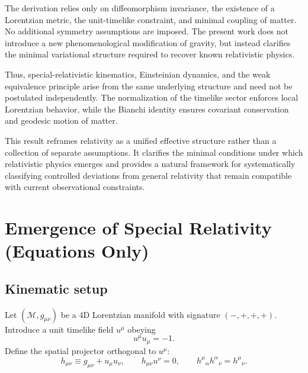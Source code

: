 \documentclass[11pt]{article}
\begin{document}
        The derivation relies only on diffeomorphism invariance, the existence of a
        Lorentzian metric, the unit-timelike constraint, and minimal coupling of matter.
        No additional symmetry assumptions are imposed.
        The present work does not introduce a new phenomenological modification of
        gravity, but instead clarifies the minimal variational structure required to
        recover known relativistic physics.

        Thus, special-relativistic kinematics, Einsteinian dynamics, and the weak
        equivalence principle arise from the same underlying structure and need not be
        postulated independently. The normalization of the timelike sector enforces
        local Lorentzian behavior, while the Bianchi identity ensures covariant
        conservation and geodesic motion of matter.

        This result reframes relativity as a unified effective structure rather than a
        collection of separate assumptions. It clarifies the minimal conditions under
        which relativistic physics emerges and provides a natural framework for
        systematically classifying controlled deviations from general relativity that
        remain compatible with current observational constraints.


    \section{Emergence of Special Relativity (Equations Only)}
        \label{sec:sr-emergence}

        \subsection{Kinematic setup}
            Let $(\mathcal{M},g_{\mu\nu})$ be a 4D Lorentzian manifold with signature $(-,+,+,+)$.
            Introduce a unit timelike field $u^\mu$ obeying
            \begin{equation}
                u^\mu u_\mu = -1.
            \end{equation}
            Define the spatial projector orthogonal to $u^\mu$:
            \begin{equation}
                h_{\mu\nu} \equiv g_{\mu\nu} + u_\mu u_\nu,
                \qquad
                h_{\mu\nu} u^\nu = 0,
                \qquad
                h^\mu{}_\alpha h^\alpha{}_\nu = h^\mu{}_\nu.
            \end{equation}
\end{document}
